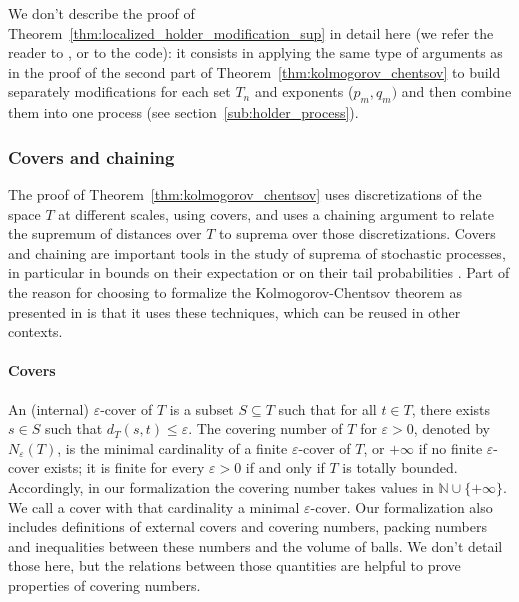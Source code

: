 \documentclass[lean]{Draft}
\begin{document}
We don't describe the proof of Theorem~\ref{thm:localized_holder_modification_sup} in detail here (we refer the reader to \cite{kratschmer2023kolmogorov}, or to the code): it consists in applying the same type of arguments as in the proof of the second part of Theorem~\ref{thm:kolmogorov_chentsov} to build separately modifications for each set $T_n$ and exponents ($p_m, q_m)$ and then combine them into one process (see section~\ref{sub:holder_process}).



\subsubsection{Covers and chaining}

The proof of Theorem~\ref{thm:kolmogorov_chentsov} uses discretizations of the space $T$ at different scales, using covers, and uses a chaining argument to relate the supremum of distances over $T$ to suprema over those discretizations.
Covers and chaining are important tools in the study of suprema of stochastic processes, in particular in bounds on their expectation or on their tail probabilities \cite{talagrand2022upper, vershynin2018high}.
Part of the reason for choosing to formalize the Kolmogorov-Chentsov theorem as presented in \cite{kratschmer2023kolmogorov} is that it uses these techniques, which can be reused in other contexts.


\paragraph{Covers}

An (internal) $\varepsilon$-cover of $T$ is a subset $S \subseteq T$ such that for all $t \in T$, there exists $s \in S$ such that $d_T(s, t) \le \varepsilon$.
The covering number of $T$ for $\varepsilon > 0$, denoted by $N_\varepsilon(T)$, is the minimal cardinality of a finite $\varepsilon$-cover of $T$, or $+\infty$ if no finite $\varepsilon$-cover exists; it is finite for every $\varepsilon > 0$ if and only if $T$ is totally bounded. Accordingly, in our formalization the covering number takes values in $\mathbb{N} \cup \{+\infty\}$.
We call a cover with that cardinality a minimal $\varepsilon$-cover.
Our formalization also includes definitions of external covers and covering numbers, packing numbers and inequalities between these numbers and the volume of balls. We don't detail those here, but the relations between those quantities are helpful to prove properties of covering numbers.
\end{document}
